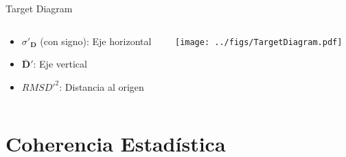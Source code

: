 \documentclass[aspectratio=169, usenames,svgnames,dvipsnames]{beamer}
\begin{document}
\begin{frame}[label={sec:orgdd6f49c}]{Target Diagram}
\begin{columns}
\begin{column}{0.3\columnwidth}
\begin{itemize}
\item \(\sigma'_{\mathbf{D}}\) (con signo): Eje horizontal
\item \(\overline{\mathbf{D}}'\): Eje vertical
\item \(RMSD'^2\): Distancia al origen
\end{itemize}
\end{column}

\begin{column}{0.7\columnwidth}
\begin{center}
\texttt{[image: ../figs/TargetDiagram.pdf]}
\end{center}
\end{column}
\end{columns}
\end{frame}


\section{Coherencia Estadística}
\label{sec:orged5eb2a}
\end{document}

